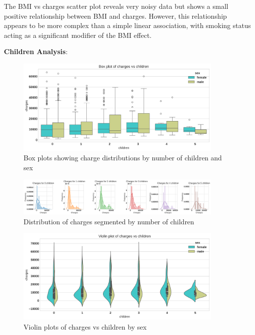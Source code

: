 \documentclass[12pt,a4paper]{article}
\begin{document}
The BMI vs charges scatter plot reveals very noisy data but shows a small positive relationship between BMI and charges. However, this relationship appears to be more complex than a simple linear association, with smoking status acting as a significant modifier of the BMI effect.

\textbf{Children Analysis}:

\begin{figure}[H]
\centering
\includegraphics[width=0.9\textwidth]{boxplot_charges_vs_children.png}
\caption{Box plots showing charge distributions by number of children and sex}
\label{fig:boxplot_charges_vs_children}
\end{figure}

\begin{figure}[H]
\centering
\includegraphics[width=0.9\textwidth]{charges_distribution_by_children.png}
\caption{Distribution of charges segmented by number of children}
\label{fig:charges_distribution_by_children}
\end{figure}

\begin{figure}[H]
\centering
\includegraphics[width=0.9\textwidth]{violin_plot_charges_vs_children_by_sex.png}
\caption{Violin plots of charges vs children by sex}
\label{fig:violin_plot_charges_vs_children_by_sex}
\end{figure}
\end{document}

